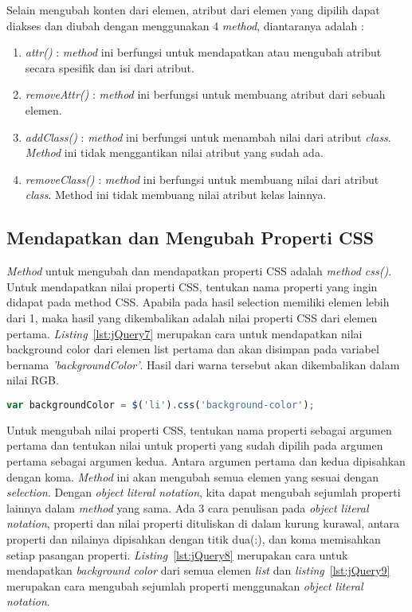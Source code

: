 Selain mengubah konten dari elemen, atribut dari elemen yang dipilih dapat diakses dan diubah dengan menggunakan 4 \textit{method}, diantaranya adalah :

\begin{enumerate}
	\item \textit{attr()} : \textit{method} ini berfungsi untuk mendapatkan atau mengubah atribut secara spesifik dan isi dari atribut.
	\item \textit{removeAttr()} : \textit{method} ini berfungsi untuk membuang atribut dari sebuah elemen.
	\item \textit{addClass()} : \textit{method} ini berfungsi untuk menambah nilai dari atribut \textit{class}. \textit{Method} ini tidak menggantikan nilai atribut yang sudah ada.
	\item \textit{removeClass()} : \textit{method} ini berfungsi untuk membuang nilai dari atribut \textit{class}. Method ini tidak membuang nilai atribut kelas lainnya.
\end{enumerate}

\subsection{Mendapatkan dan Mengubah Properti CSS}
\textit{Method} untuk mengubah dan mendapatkan properti CSS adalah \textit{method css()}. Untuk mendapatkan nilai properti CSS, tentukan nama properti yang ingin didapat pada method CSS. Apabila pada hasil selection memiliki elemen lebih dari 1, maka hasil yang dikembalikan adalah nilai properti CSS dari elemen pertama. \textit{Listing}~\ref{lst:jQuery7} merupakan cara untuk mendapatkan nilai background color dari elemen list pertama dan akan disimpan pada variabel bernama \textit{'backgroundColor'}. Hasil dari warna tersebut akan dikembalikan dalam nilai RGB. 

\begin{lstlisting}[language=Javascript, caption=Mendapatkan nilai warna \textit{background color} dari elemen \textit{list} pertama, label={lst:jQuery7}]
	var backgroundColor = $('li').css('background-color');
\end{lstlisting}

Untuk mengubah nilai properti CSS, tentukan nama properti sebagai argumen pertama dan tentukan nilai untuk properti yang sudah dipilih pada argumen pertama sebagai argumen kedua. Antara argumen pertama dan kedua dipisahkan dengan koma. \textit{Method} ini akan mengubah semua elemen yang sesuai dengan \textit{selection}. Dengan \textit{object literal notation}, kita dapat mengubah sejumlah properti lainnya dalam \textit{method} yang sama. Ada 3 cara penulisan pada \textit{object literal notation}, properti dan nilai properti dituliskan di dalam kurung kurawal, antara properti dan nilainya dipisahkan dengan titik dua(:), dan koma memisahkan setiap pasangan properti. \textit{Listing}~\ref{lst:jQuery8} merupakan cara untuk mendapatkan \textit{background color} dari semua elemen \textit{list} dan \textit{listing}~\ref{lst:jQuery9} merupakan cara mengubah sejumlah properti menggunakan \textit{object literal notation}.

